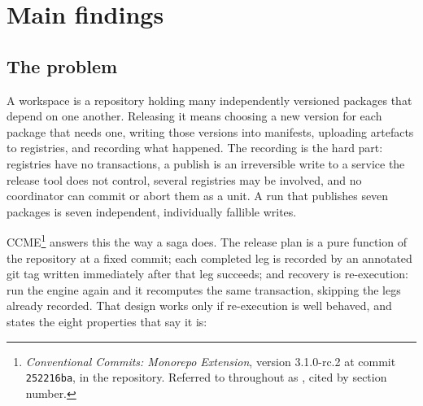 \section{Main findings}
\label{sec:intro}

\subsection{The problem}

A workspace is a repository holding many independently versioned packages that
depend on one another. Releasing it means choosing a new version for each
package that needs one, writing those versions into manifests, uploading
artefacts to registries, and recording what happened. The recording is the
hard part: registries have no transactions, a publish is an irreversible write
to a service the release tool does not control, several registries may be
involved, and no coordinator can commit or abort them as a unit. A run that
publishes seven packages is seven independent, individually fallible writes.

CCME\footnote{\emph{Conventional Commits: Monorepo Extension}, version
3.1.0-rc.2 at commit \texttt{252216ba},  in the
 repository. Referred to throughout as \SPEC{}, cited by section
number.} answers this the way a saga does. The release plan is a pure function
of the repository at a fixed commit; each completed leg is recorded by an
annotated git tag written immediately after that leg succeeds; and recovery is
re-execution: run the engine again and it recomputes the same transaction,
skipping the legs already recorded. That design works only if re-execution is
well behaved, and  states the eight properties that say it is:

